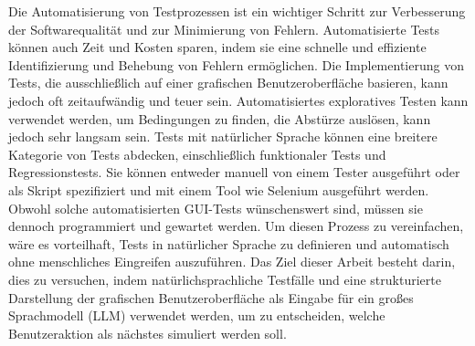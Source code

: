 
\Abstract
Die Automatisierung von Testprozessen ist ein wichtiger Schritt zur Verbesserung der Softwarequalität und zur Minimierung von Fehlern. Automatisierte Tests können auch Zeit und Kosten sparen, indem sie eine schnelle und effiziente Identifizierung und Behebung von Fehlern ermöglichen. Die Implementierung von Tests, die ausschließlich auf einer grafischen Benutzeroberfläche basieren, kann jedoch oft zeitaufwändig und teuer sein. Automatisiertes exploratives Testen kann verwendet werden, um Bedingungen zu finden, die Abstürze auslösen, kann jedoch sehr langsam sein. Tests mit natürlicher Sprache können eine breitere Kategorie von Tests abdecken, einschließlich funktionaler Tests und Regressionstests. Sie können entweder manuell von einem Tester ausgeführt oder als Skript spezifiziert und mit einem Tool wie Selenium ausgeführt werden. Obwohl solche automatisierten GUI-Tests wünschenswert sind, müssen sie dennoch programmiert und gewartet werden.
Um diesen Prozess zu vereinfachen, wäre es vorteilhaft, Tests in natürlicher Sprache zu definieren und automatisch ohne menschliches Eingreifen auszuführen. Das Ziel dieser Arbeit besteht darin, dies zu versuchen, indem natürlichsprachliche Testfälle und eine strukturierte Darstellung der grafischen Benutzeroberfläche als Eingabe für ein großes Sprachmodell (LLM) verwendet werden, um zu entscheiden, welche Benutzeraktion als nächstes simuliert werden soll.